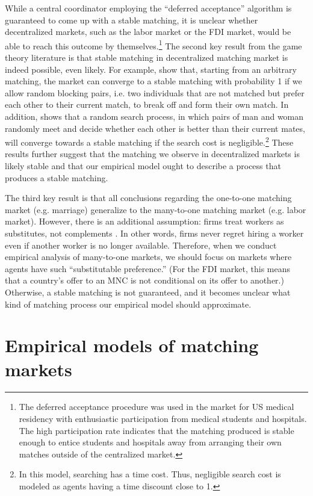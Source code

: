 While a central coordinator employing the ``deferred acceptance'' algorithm is
guaranteed to come up with a stable matching, it is unclear whether
decentralized markets, such as the labor market or the FDI market, would be able
to reach this outcome by themselves.\footnote{The deferred acceptance procedure
  was used in the market for US medical residency with enthusiastic
  participation from medical students and hospitals. The high participation rate
  indicates that the matching produced is stable enough to entice students and
  hospitals away from arranging their own matches outside of the centralized
  market.} The second key result from the game theory literature is that stable
matching in decentralized matching market is indeed possible, even likely. For
example, \citet{Roth2016} show that, starting from an arbitrary matching, the
market can converge to a stable matching with probability 1 if we allow random
blocking pairs, i.e. two individuals that are not matched but prefer each other
to their current match, to break off and form their own match. In addition,
\citet{Adachi2003} shows that a random search process, in which pairs of man and
woman randomly meet and decide whether each other is better than their current
mates, will converge towards a stable matching if the search cost is
negligible.\footnote{In this model, searching has a time cost. Thus, negligible
  search cost is modeled as agents having a time discount close to 1.} These
results further suggest that the matching we observe in decentralized markets is
likely stable and that our empirical model ought to describe a process that
produces a stable matching.

The third key result is that all conclusions regarding the one-to-one matching
market (e.g. marriage) generalize to the many-to-one matching market (e.g. labor
market). However, there is an additional assumption: firms treat workers as
substitutes, not complements \citep{Roth1992}. In other words, firms never
regret hiring a worker even if another worker is no longer available. Therefore,
when we conduct empirical analysis of many-to-one markets, we should focus on
markets where agents have such ``substitutable preference.'' (For the FDI
market, this means that a country's offer to an MNC is not conditional on its
offer to another.) Otherwise, a stable matching is not guaranteed, and it
becomes unclear what kind of matching process our empirical model should
approximate.

\section{Empirical models of matching markets}

